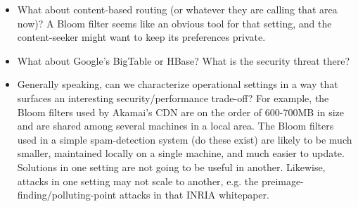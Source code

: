 \begin{itemize}
\item What about content-based routing (or whatever they are calling that area now)?  A Bloom filter seems like an obvious tool for that setting, and the content-seeker might want to keep its preferences private.

\item What about Google's BigTable or HBase?  What is the security threat there?

\item Generally speaking, can we characterize operational settings in a way that surfaces an interesting security/performance trade-off?  For example, the Bloom filters used by Akamai's CDN are on the order of 600-700MB in size and are shared among several machines in a local area.  The Bloom filters used in a simple spam-detection system (do these exist) are likely to be much smaller, maintained locally on a single machine, and much easier to update.  Solutions in one setting are not going to be useful in another.  Likewise, attacks in one setting may not scale to another, e.g. the preimage-finding/polluting-point attacks in that INRIA whitepaper.

\end{itemize}
